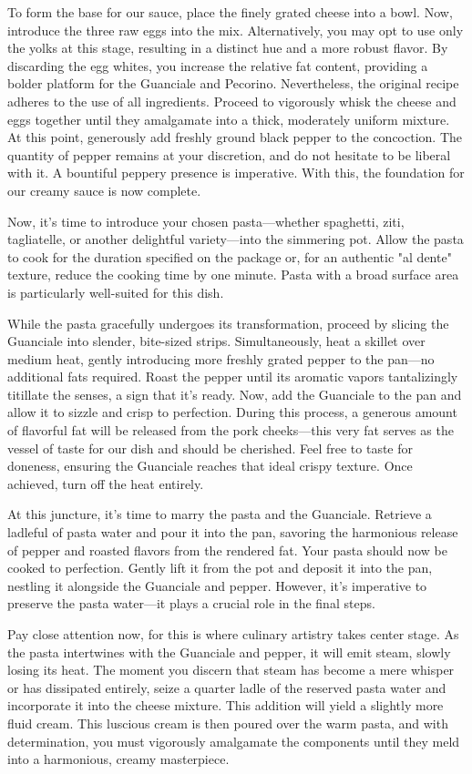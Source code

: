 To form the base for our sauce, place the finely grated cheese into a bowl. Now, introduce the three raw eggs into the mix. Alternatively, you may opt to use only the yolks at this stage, resulting in a distinct hue and a more robust flavor. By discarding the egg whites, you increase the relative fat content, providing a bolder platform for the Guanciale and Pecorino. Nevertheless, the original recipe adheres to the use of all ingredients. Proceed to vigorously whisk the cheese and eggs together until they amalgamate into a thick, moderately uniform mixture. At this point, generously add freshly ground black pepper to the concoction. The quantity of pepper remains at your discretion, and do not hesitate to be liberal with it. A bountiful peppery presence is imperative. With this, the foundation for our creamy sauce is now complete.

Now, it's time to introduce your chosen pasta—whether spaghetti, ziti, tagliatelle, or another delightful variety—into the simmering pot. Allow the pasta to cook for the duration specified on the package or, for an authentic "al dente" texture, reduce the cooking time by one minute. Pasta with a broad surface area is particularly well-suited for this dish.

While the pasta gracefully undergoes its transformation, proceed by slicing the Guanciale into slender, bite-sized strips. Simultaneously, heat a skillet over medium heat, gently introducing more freshly grated pepper to the pan—no additional fats required. Roast the pepper until its aromatic vapors tantalizingly titillate the senses, a sign that it's ready. Now, add the Guanciale to the pan and allow it to sizzle and crisp to perfection. During this process, a generous amount of flavorful fat will be released from the pork cheeks—this very fat serves as the vessel of taste for our dish and should be cherished. Feel free to taste for doneness, ensuring the Guanciale reaches that ideal crispy texture. Once achieved, turn off the heat entirely.

At this juncture, it's time to marry the pasta and the Guanciale. Retrieve a ladleful of pasta water and pour it into the pan, savoring the harmonious release of pepper and roasted flavors from the rendered fat. Your pasta should now be cooked to perfection. Gently lift it from the pot and deposit it into the pan, nestling it alongside the Guanciale and pepper. However, it's imperative to preserve the pasta water—it plays a crucial role in the final steps.

Pay close attention now, for this is where culinary artistry takes center stage. As the pasta intertwines with the Guanciale and pepper, it will emit steam, slowly losing its heat. The moment you discern that steam has become a mere whisper or has dissipated entirely, seize a quarter ladle of the reserved pasta water and incorporate it into the cheese mixture. This addition will yield a slightly more fluid cream. This luscious cream is then poured over the warm pasta, and with determination, you must vigorously amalgamate the components until they meld into a harmonious, creamy masterpiece.
\clearpage

